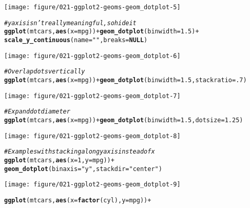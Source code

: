 \documentclass[a4paper,titlepage]{tufte-handout}\usepackage[]{graphicx}\usepackage[]{color}
\makeatletter
\def\maxwidth{ %
  \ifdim\Gin@nat@width>\linewidth
    \linewidth
  \else
    \Gin@nat@width
  \fi
}
\newcommand{\hlnum}[1]{\textcolor[rgb]{0.686,0.059,0.569}{#1}}%
\newcommand{\hlstr}[1]{\textcolor[rgb]{0.192,0.494,0.8}{#1}}%
\newcommand{\hlcom}[1]{\textcolor[rgb]{0.678,0.584,0.686}{\textit{#1}}}%
\newcommand{\hlopt}[1]{\textcolor[rgb]{0,0,0}{#1}}%
\newcommand{\hlstd}[1]{\textcolor[rgb]{0.345,0.345,0.345}{#1}}%
\newcommand{\hlkwa}[1]{\textcolor[rgb]{0.161,0.373,0.58}{\textbf{#1}}}%
\newcommand{\hlkwc}[1]{\textcolor[rgb]{0.333,0.667,0.333}{#1}}%
\newcommand{\hlkwd}[1]{\textcolor[rgb]{0.737,0.353,0.396}{\textbf{#1}}}%
\newenvironment{kframe}{%
 \def\at@end@of@kframe{}%
 \ifinner\ifhmode%
  \def\at@end@of@kframe{\end{minipage}}%
  \begin{minipage}{\columnwidth}%
 \fi\fi%
 \def\FrameCommand##1{\hskip\@totalleftmargin \hskip-\fboxsep
 \colorbox{shadecolor}{##1}\hskip-\fboxsep
     \hskip-\linewidth \hskip-\@totalleftmargin \hskip\columnwidth}%
 \MakeFramed {\advance\hsize-\width
   \@totalleftmargin\z@ \linewidth\hsize
   \@setminipage}}%
 {\par\unskip\endMakeFramed%
 \at@end@of@kframe}
\newenvironment{knitrout}{}{} %
\makeatother
\begin{document}
\begin{knitrout}
\begin{kframe}
\end{kframe}
\texttt{[image: figure/021-ggplot2-geoms-geom\_dotplot-5]} 
\begin{kframe}\begin{alltt}
\hlcom{# y axis isn't really meaningful, so hide it}
\hlkwd{ggplot}\hlstd{(mtcars,} \hlkwd{aes}\hlstd{(}\hlkwc{x} \hlstd{= mpg))} \hlopt{+} \hlkwd{geom_dotplot}\hlstd{(}\hlkwc{binwidth} \hlstd{=} \hlnum{1.5}\hlstd{)} \hlopt{+}
  \hlkwd{scale_y_continuous}\hlstd{(}\hlkwc{name} \hlstd{=} \hlstr{""}\hlstd{,} \hlkwc{breaks} \hlstd{=} \hlkwa{NULL}\hlstd{)}
\end{alltt}
\end{kframe}
\texttt{[image: figure/021-ggplot2-geoms-geom\_dotplot-6]} 
\begin{kframe}\begin{alltt}
\hlcom{# Overlap dots vertically}
\hlkwd{ggplot}\hlstd{(mtcars,} \hlkwd{aes}\hlstd{(}\hlkwc{x} \hlstd{= mpg))} \hlopt{+} \hlkwd{geom_dotplot}\hlstd{(}\hlkwc{binwidth} \hlstd{=} \hlnum{1.5}\hlstd{,} \hlkwc{stackratio} \hlstd{=} \hlnum{.7}\hlstd{)}
\end{alltt}
\end{kframe}
\texttt{[image: figure/021-ggplot2-geoms-geom\_dotplot-7]} 
\begin{kframe}\begin{alltt}
\hlcom{# Expand dot diameter}
\hlkwd{ggplot}\hlstd{(mtcars,} \hlkwd{aes}\hlstd{(}\hlkwc{x}  \hlstd{=mpg))} \hlopt{+} \hlkwd{geom_dotplot}\hlstd{(}\hlkwc{binwidth} \hlstd{=} \hlnum{1.5}\hlstd{,} \hlkwc{dotsize} \hlstd{=} \hlnum{1.25}\hlstd{)}
\end{alltt}
\end{kframe}
\texttt{[image: figure/021-ggplot2-geoms-geom\_dotplot-8]} 
\begin{kframe}\begin{alltt}
\hlcom{# Examples with stacking along y axis instead of x}
\hlkwd{ggplot}\hlstd{(mtcars,} \hlkwd{aes}\hlstd{(}\hlkwc{x} \hlstd{=} \hlnum{1}\hlstd{,} \hlkwc{y} \hlstd{= mpg))} \hlopt{+}
  \hlkwd{geom_dotplot}\hlstd{(}\hlkwc{binaxis} \hlstd{=} \hlstr{"y"}\hlstd{,} \hlkwc{stackdir} \hlstd{=} \hlstr{"center"}\hlstd{)}
\end{alltt}
\end{kframe}
\texttt{[image: figure/021-ggplot2-geoms-geom\_dotplot-9]} 
\begin{kframe}\begin{alltt}
\hlkwd{ggplot}\hlstd{(mtcars,} \hlkwd{aes}\hlstd{(}\hlkwc{x} \hlstd{=} \hlkwd{factor}\hlstd{(cyl),} \hlkwc{y} \hlstd{= mpg))} \hlopt{+}

\end{alltt}
\end{kframe}
\end{knitrout}
\end{document}
